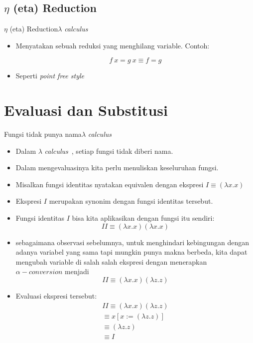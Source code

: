 \documentclass[aspectratio=1610,10pt,handout]{beamer}
\newcommand{\lc}{$\lambda$ {\it calculus}\ }
\begin{document}
\subsection{$\eta$ (eta) Reduction}
\begin{frame}{$\eta$ (eta) Reduction}{\lc}
	\begin{itemize}
		\item Menyatakan sebuah reduksi yang menghilang variable.
		Contoh:

		$$f\ x = g\ x  \equiv f = g$$

		\item Seperti \textit{point free style}
	\end{itemize}
\end{frame}


\section{Evaluasi dan Substitusi}
\begin{frame}{Fungsi tidak punya nama}{\lc }

	\begin{itemize}
		\item<1-> Dalam \lc, setiap fungsi tidak diberi nama.
		\item<1-> Dalam mengevaluasinya kita perlu menuliskan keseluruhan fungsi.
		\item<2-> Misalkan fungsi identitas nyatakan equivalen dengan ekspresi $I \equiv (\lambda x.x)$
		\item<2-> Ekspresi $I$ merupakan synonim dengan fungsi identitas tersebut.
		\item<3-> Fungsi identitas $I$ bisa kita aplikasikan dengan fungsi itu sendiri:
		$$ I I \equiv (\lambda x.x) (\lambda x.x)$$
		\item<3-> sebagaimana observasi sebelumnya, untuk menghindari kebingungan dengan adanya variabel yang sama tapi mungkin punya makna berbeda, kita dapat mengubah variable di salah salah ekspresi dengan menerapkan $\alpha-conversion$ menjadi
		$$ I I \equiv (\lambda x.x) (\lambda z.z)$$
		\item<4-> Evaluasi ekspresi tersebut:
		\[
		\begin{array}{l}
		I I \equiv (\lambda x.x) (\lambda z.z)\\
		\equiv x [x:= (\lambda z.z)] \\
		\equiv (\lambda z.z) \\
		\equiv I \\
		\end{array}
		\]
	\end{itemize}
\end{frame}
\end{document}
